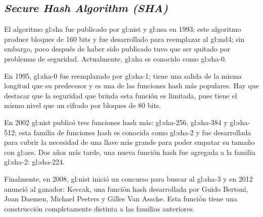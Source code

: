 \subsection{\textit{Secure Hash Algorithm (SHA)}}
El algoritmo \acrshort{gl:sha} fue publicado por \acrshort{gl:nist} y
\acrshort{gl:nsa} en 1993; este algoritmo produce bloques de 160 bits y
fue desarrollado para reemplazar al \acrshort{gl:md4}; sin embargo, poco
después de haber sido publicado tuvo que ser quitado por problemas de
seguridad. Actualmente, \acrshort{gl:sha} es conocido como \acrshort{gl:sha}-0.

En 1995, \acrshort{gl:sha}-0 fue reemplazado por \acrshort{gl:sha}-1; tiene
una salida de la misma longitud que su predecesor y es una de las funciones
hash más populares. Hay que destacar que la seguridad que brinda esta función
es limitada, pues tiene el mismo nivel que un cifrado por bloques de 80 bits.

En 2002 \acrshort{gl:nist} publicó tres funciones hash más:
\acrshort{gl:sha}-256, \acrshort{gl:sha}-384 y \acrshort{gl:sha}-512; esta
familia de funciones hash es conocida como \acrshort{gl:sha}-2 y fue
desarrollada para cubrir la necesidad de una llave más grande para poder
empatar su tamaño con \acrshort{gl:aes}. Dos años más tarde, una nueva
función hash fue agregada a la familia \acrshort{gl:sha}-2:
\acrshort{gl:sha}-224.

Finalmente, en 2008, \acrshort{gl:nist} inició un concurso para buscar al
\acrshort{gl:sha}-3 y en 2012 anunció al ganador: Keccak, una función hash
desarrollada por Guido Bertoni, Joan Daemen, Michael Peeters y Gilles Van
Assche. Esta función tiene una construcción completamente distinta a las
familias anteriores.
